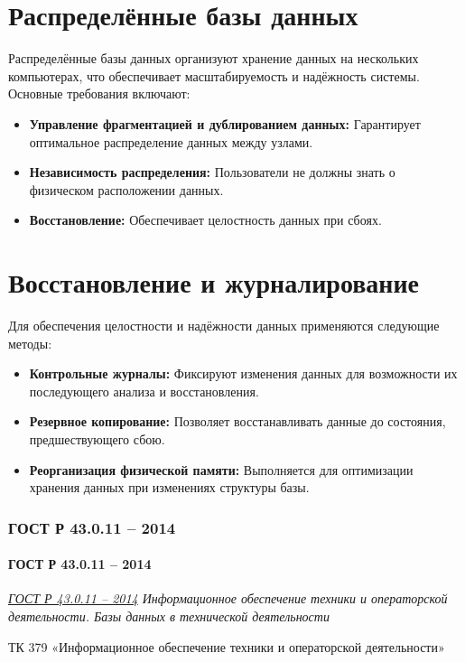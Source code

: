 \section*{Распределённые базы данных}
Распределённые базы данных организуют хранение данных на нескольких компьютерах, что обеспечивает масштабируемость и надёжность системы. Основные требования включают:
\begin{itemize}
    \item \textbf{Управление фрагментацией и дублированием данных:} Гарантирует оптимальное распределение данных между узлами.
    \item \textbf{Независимость распределения:} Пользователи не должны знать о физическом расположении данных.
    \item \textbf{Восстановление:} Обеспечивает целостность данных при сбоях.
\end{itemize}

\section*{Восстановление и журналирование}
Для обеспечения целостности и надёжности данных применяются следующие методы:
\begin{itemize}
    \item \textbf{Контрольные журналы:} Фиксируют изменения данных для возможности их последующего анализа и восстановления.
    \item \textbf{Резервное копирование:} Позволяет восстанавливать данные до состояния, предшествующего сбою.
    \item \textbf{Реорганизация физической памяти:} Выполняется для оптимизации хранения данных при изменениях структуры базы.
\end{itemize}

\subsubsection{ГОСТ Р 43.0.11 -- 2014}
\paragraph{ГОСТ Р 43.0.11 -- 2014}

\emph{\href{https://internet-law.ru/gosts/gost/57862/}{ГОСТ Р 43.0.11 -- 2014}
Информационное обеспечение техники и операторской деятельности.
Базы данных в технической деятельности
}
\par
ТК 379 «Информационное обеспечение
техники и операторской деятельности»
